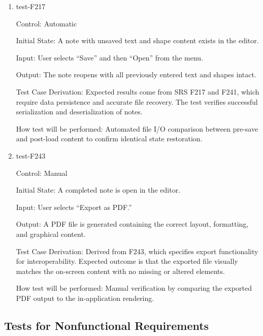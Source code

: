 \documentclass[12pt, titlepage]{article}
\begin{document}
\begin{enumerate}

\item{test-F217\\}

Control: Automatic

Initial State: A note with unsaved text and shape content exists in the editor.

Input: User selects “Save” and then “Open” from the menu.

Output: The note reopens with all previously entered text and shapes intact.

Test Case Derivation: Expected results come from SRS F217 and F241, which require data persistence and accurate file recovery.
The test verifies successful serialization and deserialization of notes.

How test will be performed: Automated file I/O comparison between pre-save and post-load content to confirm identical state restoration.

\item{test-F243\\}

Control: Manual

Initial State: A completed note is open in the editor.

Input: User selects “Export as PDF.”

Output: A PDF file is generated containing the correct layout, formatting, and graphical content.

Test Case Derivation: Derived from F243, which specifies export functionality for interoperability.
Expected outcome is that the exported file visually matches the on-screen content with no missing or altered elements.

How test will be performed: Manual verification by comparing the exported PDF output to the in-application rendering.

\end{enumerate}

\subsection{Tests for Nonfunctional Requirements}



\end{document}
